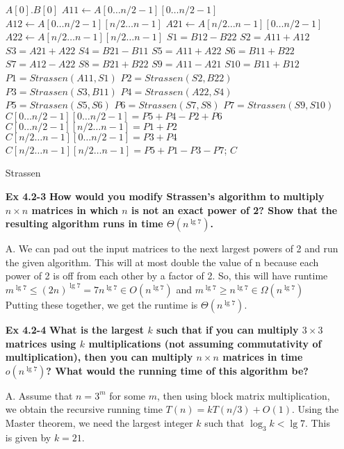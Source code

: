 \documentclass[fontsize=12pt,paper=a4,open=any]{book}
\begin{document}
\begin{enumerate}
\begin{algorithm}[H]
		{
			\Return $A[0] . B[0]$
		}
		$A11 \longleftarrow A[0 \dots n/2-1][0 \dots n/2-1]$\;
		$A12 \longleftarrow A[0 \dots n/2-1][n/2 \dots n-1]$\;
		$A21 \longleftarrow A[n/2 \dots n-1][0 \dots n/2-1]$\;
		$A22 \longleftarrow A[n/2 \dots n-1][n/2 \dots n-1]$\;
		$S1 = B12 - B22$\;
		$S2 = A11 + A12$\;
		$S3 = A21 + A22$\;
		$S4 = B21 - B11$\;
		$S5 = A11 + A22$\;
		$S6 = B11 + B22$\;
		$S7 = A12 - A22$\;
		$S8 = B21 + B22$\;
		$S9 = A11 - A21$\;
		$S10 = B11 + B12$\;
		$P1 = Strassen(A11, S1)$\;
		$P2 = Strassen(S2, B22)$\;
		$P3 = Strassen(S3, B11)$\;
		$P4 = Strassen(A22, S4)$\;
		$P5 = Strassen(S5, S6)$\;
		$P6 = Strassen(S7, S8)$\;
		$P7 = Strassen(S9, S10)$\;
		$C[0 \dots n/2-1][0 \dots n/2-1] = P5 + P4 - P2 + P6$\;
		$C[0 \dots n/2-1][n/2 \dots n-1] = P1 + P2$\;
		$C[n/2 \dots n-1][0 \dots n/2-1] = P3 + P4$\;
		$C[n/2 \dots n-1][n/2 \dots n-1] = P5 + P1 - P3 - P7$;
		\Return $C$\;
		\caption{Strassen}
		\end{algorithm}
		
	\item[\textbf{Ex 4.2-3}]
		\textbf{How would you modify Strassen’s algorithm to multiply $n \times n$ matrices in which $n$ is not an exact power of 2? Show that the resulting algorithm runs in time $\Theta(n^{\lg 7})$.}
	\item[A.]
	We can pad out the input matrices to the next largest powers of 2 and run the given algorithm. This will at most double the value of n because each power of 2 is off from each other by a factor of 2. So, this will have runtime \\
	$m^{\lg 7} \leq (2n)^{\lg 7} = 7n^{\lg 7} \in O(n^{\lg 7})$ and $m^{\lg 7} \geq n^{\lg 7} \in \Omega(n^{\lg 7})$ \\
	Putting these together, we get the runtime is $\Theta(n^{\lg 7})$.
	
	\item[\textbf{Ex 4.2-4}]
		\textbf{What is the largest $k$ such that if you can multiply $3 \times 3$ matrices using $k$ multiplications (not assuming commutativity of multiplication), then you can multiply $n \times n$ matrices in time $o(n^{\lg 7})$? What would the running time of this algorithm be?}
	\item[A.]
	Assume that $n=3^m$ for some $m$, then using block matrix multiplication, we obtain the recursive running time $T(n) = kT(n/3) + O(1)$. Using the Master theorem, we need the largest integer $k$ such that $\log_3 k < \lg 7$. This is given by $k=21$.


\end{enumerate}
\end{document}
